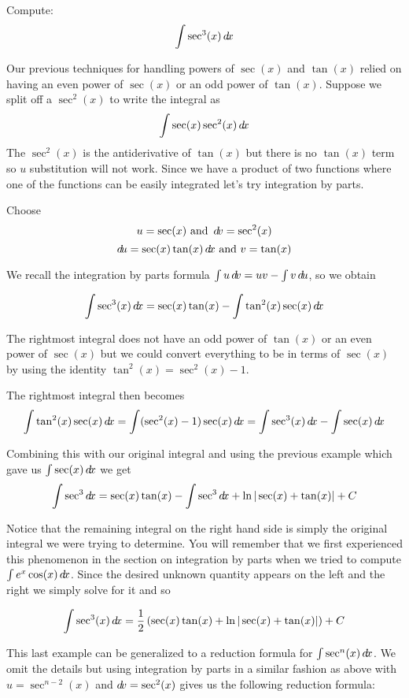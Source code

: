 \documentclass{ximera}
\begin{document}
\begin{example}
Compute: 
\[
\int \sec^{3}(x) \mathop{}\!d\! x 
\]
\begin{explanation}
Our previous techniques for handling powers of $\sec(x)$ and $\tan(x)$ relied on having an even power of $\sec(x)$ or an odd power of $\tan(x)$. 
Suppose we split off a $\sec^{2}(x)$ to write the integral as 
\[
 \int \sec(x) \sec^{2}(x) \mathop{}\!d\! x
\]
The $\sec^{2}(x)$ is the antiderivative of $\tan(x)$ but there is no $\tan(x)$ term so $u$ substitution will not work. Since we have a product of two functions where one 
of the functions can be easily integrated let's try integration by parts. 

Choose
\[ 
u= \sec(x) \text{  and  } \mathop{}\!d\! v=\sec^{2}(x) \\
\] 
\[
\mathop{}\!d\! u=  \sec(x)\tan(x) \mathop{}\!d\! x \text{  and  } v=\tan(x) 
\]

We recall the integration by parts formula $\int u \mathop{}\!d\! v=uv-\int v \mathop{}\!d\! u$, so we obtain

\[
\int \sec^{3}(x) \mathop{}\!d\! x=\sec(x)\tan(x) - \int \tan^{2}(x)\sec(x)\mathop{}\!d\! x
\]

The rightmost integral does not have an odd power of $\tan(x)$ or an even power of $\sec(x)$ but we could convert 
everything to be in terms of $\sec(x)$ by using the identity $\tan^{2}(x)=\sec^{2}(x)-1$. 

The rightmost integral then becomes
\[
\int \tan^{2}(x)\sec(x) \d x=\int (\sec^{2}(x)-1) \sec(x) \d x= \int \sec^{3}(x)\d x - \int \sec(x) \d x
\]

Combining this with our original integral and using the previous example which gave us $\int \sec(x) \mathop{}\!d\! x$ we get
\[
\int \sec^{3} \mathop{}\!d\! x=\sec(x) \tan(x)- \int \sec^{3} \mathop{}\!d\! x + \ln| \sec(x)+\tan(x) | + C
\]

Notice that the remaining integral on the right hand side is simply the original integral we were trying to determine. You will remember that we first experienced this phenomenon in the section on integration by parts when we tried to compute $\int e^{x}\cos(x) \mathop{}\!d\! x$. 
Since the desired unknown quantity appears on the left and the right we simply solve for it and so

\[
\int \sec^{3}(x) \mathop{}\!d\! x=\frac{1}{2}\left(\sec(x) \tan(x) + \ln | \sec(x) + \tan(x)|  \right)  + C
\]
\end{explanation}
\end{example}

This last example can be generalized to a reduction formula for $\int \sec^{n}(x) \mathop{}\!d\! x$. We omit the details but using integration by parts in a similar fashion
as above with $u=\sec^{n-2}(x)$ and $\mathop{}\!d\! v=\sec^{2}(x)$ gives us the following reduction formula:
\end{document}
